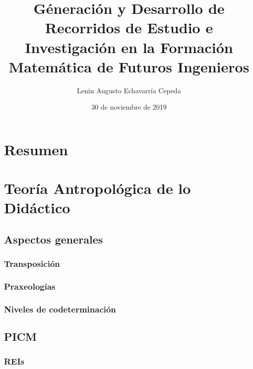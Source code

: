 \documentclass[spanish,]{book}
\title{Géneración y Desarrollo de Recorridos de Estudio e Investigación en la Formación Matemática de Futuros Ingenieros}
\author{Lenin Augusto Echavarría Cepeda}
\date{30 de noviembre de 2019}
\begin{document}
\maketitle

{
\setcounter{tocdepth}{1}
\tableofcontents
}
\hypertarget{resumen}{%
\chapter*{Resumen}\label{resumen}}

\hypertarget{teoruxeda-antropoluxf3gica-de-lo-diduxe1ctico}{%
\chapter{Teoría Antropológica de lo Didáctico}\label{teoruxeda-antropoluxf3gica-de-lo-diduxe1ctico}}

\hypertarget{aspectos-generales}{%
\section{Aspectos generales}\label{aspectos-generales}}

\hypertarget{transposiciuxf3n}{%
\subsection{Transposición}\label{transposiciuxf3n}}

\hypertarget{praxeologuxedas}{%
\subsection{Praxeologías}\label{praxeologuxedas}}

\hypertarget{niveles-de-codeterminaciuxf3n}{%
\subsection{Niveles de codeterminación}\label{niveles-de-codeterminaciuxf3n}}

\hypertarget{picm}{%
\section{PICM}\label{picm}}

\hypertarget{reis}{%
\subsection{REIs}\label{reis}}
\end{document}
